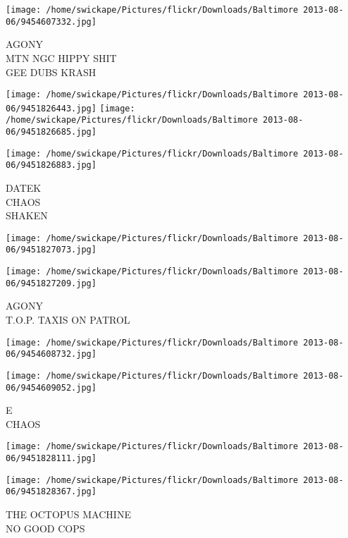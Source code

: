 \documentclass[10pt,letterpaper]{article}
\begin{document}
\vspace{0.25in}
\texttt{[image: /home/swickape/Pictures/flickr/Downloads/Baltimore 2013-08-06/9454607332.jpg]}

AGONY\\
MTN NGC HIPPY SHIT\\
GEE DUBS KRASH\\
\pagebreak

\texttt{[image: /home/swickape/Pictures/flickr/Downloads/Baltimore 2013-08-06/9451826443.jpg]}
\texttt{[image: /home/swickape/Pictures/flickr/Downloads/Baltimore 2013-08-06/9451826685.jpg]}

\texttt{[image: /home/swickape/Pictures/flickr/Downloads/Baltimore 2013-08-06/9451826883.jpg]}

DATEK\\
CHAOS\\
SHAKEN\\
\pagebreak

\texttt{[image: /home/swickape/Pictures/flickr/Downloads/Baltimore 2013-08-06/9451827073.jpg]}

\vspace{0.25in}
\texttt{[image: /home/swickape/Pictures/flickr/Downloads/Baltimore 2013-08-06/9451827209.jpg]}

AGONY\\
T.O.P. TAXIS ON PATROL\\
\pagebreak

\texttt{[image: /home/swickape/Pictures/flickr/Downloads/Baltimore 2013-08-06/9454608732.jpg]}

\vspace{0.25in}
\texttt{[image: /home/swickape/Pictures/flickr/Downloads/Baltimore 2013-08-06/9454609052.jpg]}

E\\
CHAOS\\
\pagebreak

\texttt{[image: /home/swickape/Pictures/flickr/Downloads/Baltimore 2013-08-06/9451828111.jpg]}

\vspace{0.25in}
\texttt{[image: /home/swickape/Pictures/flickr/Downloads/Baltimore 2013-08-06/9451828367.jpg]}

THE OCTOPUS MACHINE\\
NO GOOD COPS\\
\pagebreak
\end{document}
